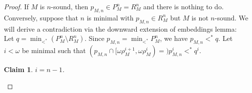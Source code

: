 \documentclass[12pt,a4paper]{article}
\theoremstyle{nicestyle}
\newtheorem{claim}{Claim}[subsection]
\begin{document}
  \begin{proof}
    If $M$ is $n$-sound, then $p_{M,n} \in P^{n}_{M} = R^{n}_{M}$ and there is nothing to do. \\
    Conversely, suppose that $n$ is minimal with
    $p_{M,n} \in R^{n}_{M}$ but $M$ is not $n$-sound. We will derive a
    contradiction via the downward extension of embeddings lemma: \\

    Let $q = \min_{<^{*}} (P^{n}_{M} \setminus R^{n}_{M})$. Since
    $p_{M,n} = \min_{<^{*}} P^{n}_{M}$, we have $p_{M,n} <^{*} q$. Let
    $i < \omega$ be minimal such that
    $(p_{M,n} \cap [\omega\rho^{i+1}_{M}, \omega\rho^{i}_{M})
    =)p_{M,n}^{i} <^{*} q^{i}$.

    \begin{claim}
      $i = n-1$.
      
    \end{claim}


\end{proof}
\end{document}
